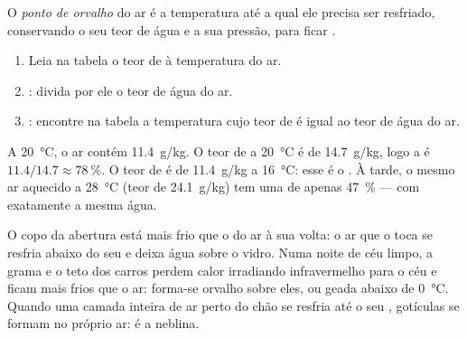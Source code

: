 \begin{definition}\label{def:g10:why-clouds-form:dew-point}
O \emph{ponto de orvalho} do ar é a temperatura até
a qual ele precisa ser resfriado, conservando o seu teor de água e a sua
pressão, para ficar .
\end{definition}

\begin{method}\label{met:g10:why-clouds-form:table}
\begin{enumerate}
  \item Leia na tabela o teor de  à temperatura do ar.
  \item {}: divida por ele o teor de água do ar.
  \item {}: encontre na tabela a temperatura cujo teor de
         é igual ao teor de água do ar.
\end{enumerate}
\end{method}

\begin{example}\label{ex:g10:why-clouds-form:morning}
A \qty{20}{\degreeCelsius}, o ar contém \qty{11.4}{g/kg}. O teor de
 a \qty{20}{\degreeCelsius} é de \qty{14.7}{g/kg}, logo a  é $11.4/14.7 \approx \qty{78}{\percent}$. O teor de  é de
\qty{11.4}{g/kg} a \qty{16}{\degreeCelsius}: esse é o . À
tarde, o mesmo ar aquecido a \qty{28}{\degreeCelsius} (teor de 
\qty{24.1}{g/kg}) tem uma  de apenas \qty{47}{\percent} ---
com exatamente a mesma água.
\end{example}

O copo da abertura está mais frio que o  do ar à sua volta:
o ar que o toca se resfria abaixo do seu  e deixa água sobre
o vidro. Numa noite de céu limpo, a grama e o teto dos carros perdem calor
irradiando infravermelho para o céu e ficam mais frios que o ar: forma-se
orvalho sobre eles, ou geada abaixo de \qty{0}{\degreeCelsius}. Quando uma
camada inteira de ar perto do chão se resfria até o seu ,
gotículas se formam no próprio ar: é a neblina.

